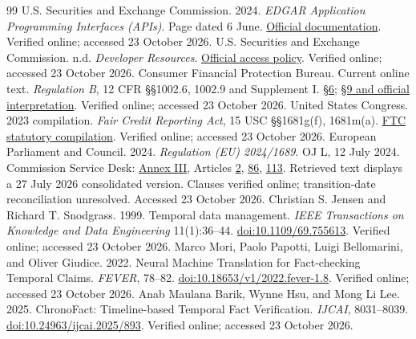\renewcommand{\refname}{15. References}
\begingroup\small
\begin{thebibliography}{99}
\setlength{\itemsep}{4pt}
 U.S. Securities and Exchange Commission. 2024. \emph{EDGAR Application Programming Interfaces (APIs)}. Page dated 6 June. \href{https://www.sec.gov/search-filings/edgar-application-programming-interfaces}{Official documentation}. Verified online; accessed 23 October 2026.
 U.S. Securities and Exchange Commission. n.d. \emph{Developer Resources}. \href{https://www.sec.gov/about/developer-resources}{Official access policy}. Verified online; accessed 23 October 2026.
 Consumer Financial Protection Bureau. Current online text. \emph{Regulation B}, 12 CFR §§1002.6, 1002.9 and Supplement I. \href{https://www.consumerfinance.gov/rules-policy/regulations/1002/6/}{§6}; \href{https://www.consumerfinance.gov/rules-policy/regulations/1002/9/}{§9 and official interpretation}. Verified online; accessed 23 October 2026.
 United States Congress. 2023 compilation. \emph{Fair Credit Reporting Act}, 15 USC §§1681g(f), 1681m(a). \href{https://www.ftc.gov/system/files/ftc_gov/pdf/fcra-may2023-508.pdf}{FTC statutory compilation}. Verified online; accessed 23 October 2026.
 European Parliament and Council. 2024. \emph{Regulation (EU) 2024/1689}. OJ L, 12 July 2024. Commission Service Desk: \href{https://ai-act-service-desk.ec.europa.eu/en/ai-act/annex-3}{Annex III}, Articles \href{https://ai-act-service-desk.ec.europa.eu/en/ai-act/article-2}{2}, \href{https://ai-act-service-desk.ec.europa.eu/en/ai-act/article-86}{86}, \href{https://ai-act-service-desk.ec.europa.eu/en/ai-act/article-113}{113}. Retrieved text displays a 27 July 2026 consolidated version. Clauses verified online; transition-date reconciliation unresolved. Accessed 23 October 2026.
 Christian S. Jensen and Richard T. Snodgrass. 1999. Temporal data management. \emph{IEEE Transactions on Knowledge and Data Engineering} 11(1):36--44. \href{https://doi.org/10.1109/69.755613}{doi:10.1109/69.755613}. Verified online; accessed 23 October 2026.
 Marco Mori, Paolo Papotti, Luigi Bellomarini, and Oliver Giudice. 2022. Neural Machine Translation for Fact-checking Temporal Claims. \emph{FEVER}, 78--82. \href{https://aclanthology.org/2022.fever-1.8/}{doi:10.18653/v1/2022.fever-1.8}. Verified online; accessed 23 October 2026.
 Anab Maulana Barik, Wynne Hsu, and Mong Li Lee. 2025. ChronoFact: Timeline-based Temporal Fact Verification. \emph{IJCAI}, 8031--8039. \href{https://www.ijcai.org/proceedings/2025/893}{doi:10.24963/ijcai.2025/893}. Verified online; accessed 23 October 2026.

\end{thebibliography}
